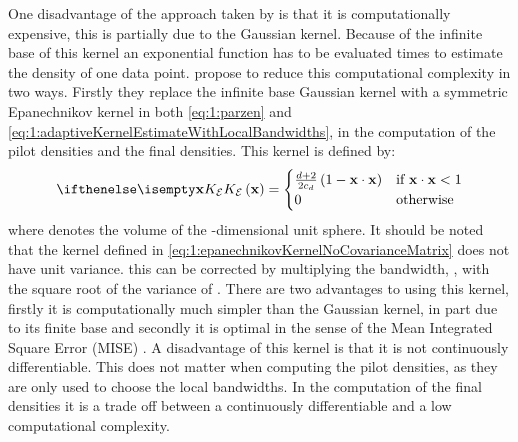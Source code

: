 	One disadvantage of the approach taken by \citeauthor{breiman1977variable} is that it is computationally expensive, this is partially due to the Gaussian kernel. Because of the infinite base of this kernel an exponential function has to be evaluated \varNumPatterns times to estimate the density of one data point. 
	\textcite{wilkinson1995dataplot} propose to reduce this computational complexity in two ways. Firstly they replace the infinite base Gaussian kernel with a symmetric Epanechnikov kernel in both \cref{eq:1:parzen} and \cref{eq:1:adaptiveKernelEstimateWithLocalBandwidths}, \ie in the computation of the pilot densities and the final densities. This kernel is defined by:
	\begin{equation}\label{eq:1:epanechnikovKernelNoCovarianceMatrix}
		\varKernel[\varEpan]{\varPattern} = 
		\begin{cases}
			\frac{\varDim + 2}{2\varUnitSphere{\varDim}} \left( 1 - \varPattern \cdot \varPattern \right) & \text{if } \varPattern \cdot \varPattern < 1\\
			0 & \text{otherwise}
		\end{cases}
	\end{equation}
	 where \varUnitSphere{\varDim} denotes the volume of the \varDim-dimensional unit sphere. It should be noted that the kernel defined in \cref{eq:1:epanechnikovKernelNoCovarianceMatrix} does not have unit variance. this can be corrected by multiplying the bandwidth, \varBandwidth,  with the square root of the variance of \varKernel[\varEpan]{}. There are two advantages to using this kernel, firstly it is computationally much simpler than the Gaussian kernel, in part due to its finite base and secondly it is optimal in the sense of the Mean Integrated Square Error (MISE) \cite{epanechnikov1969non}. A disadvantage of this kernel is that it is not continuously differentiable. This does not matter when computing the pilot densities, as they are only used to choose the local bandwidths. In the computation of the final densities it is a trade off between a continuously differentiable \varEstimatedDensityFunction{} and a low computational complexity.

